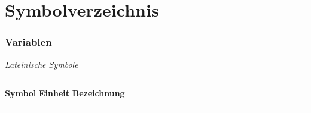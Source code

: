 \chapter*{Symbolverzeichnis}


\subsection*{Variablen}
\vspace{\linespace}
\textit{Lateinische Symbole} \\[.5\linespace]
\noindent\rule{\textwidth}{0.5pt}
\textbf{Symbol} \hspace{12.5mm} \textbf{Einheit} \hspace{10.5mm} \textbf{Bezeichnung} \\[-\linespace]
\noindent\rule{\textwidth}{0.5pt}


